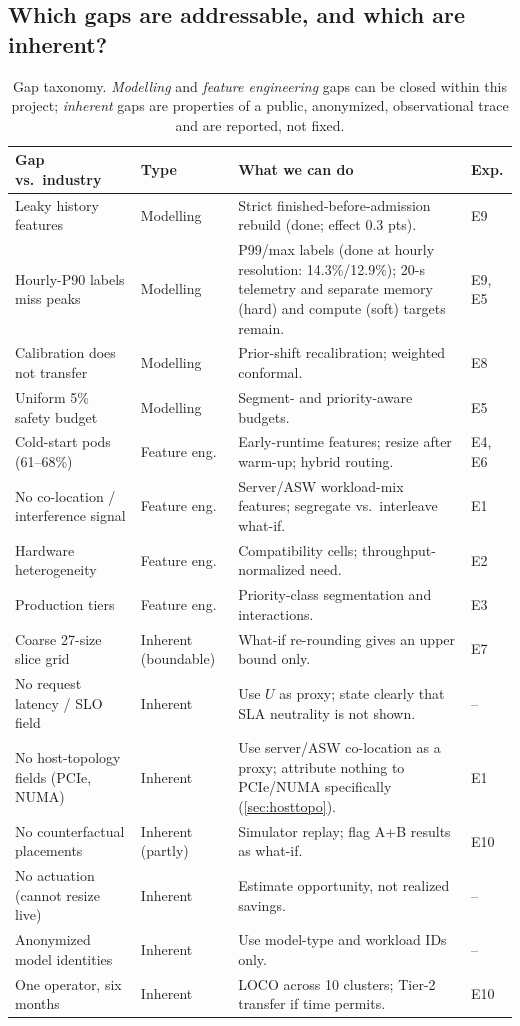 \subsection{Which gaps are addressable, and which are inherent?}

\begin{table}[h]
\centering\small
\caption{Gap taxonomy. \emph{Modelling} and \emph{feature engineering} gaps can be closed within this project; \emph{inherent} gaps are properties of a public, anonymized, observational trace and are reported, not fixed.}
\label{tab:gaps}
\begin{tabularx}{\linewidth}{@{}P{3.2cm}P{1.9cm}LP{1.0cm}@{}}
\toprule
Gap vs.\ industry & Type & What we can do & Exp. \\
\midrule
Leaky history features & Modelling & Strict finished-before-admission rebuild (done; effect 0.3 pts). & E9 \\
Hourly-P90 labels miss peaks & Modelling & P99/max labels (done at hourly resolution: 14.3\%/12.9\%); 20-s telemetry and separate memory (hard) and compute (soft) targets remain. & E9, E5 \\
Calibration does not transfer & Modelling & Prior-shift recalibration; weighted conformal. & E8 \\
Uniform 5\% safety budget & Modelling & Segment- and priority-aware budgets. & E5 \\
Cold-start pods (61--68\%) & Feature eng. & Early-runtime features; resize after warm-up; hybrid routing. & E4, E6 \\
No co-location / interference signal & Feature eng. & Server/ASW workload-mix features; segregate vs.\ interleave what-if. & E1 \\
Hardware heterogeneity & Feature eng. & Compatibility cells; throughput-normalized need. & E2 \\
Production tiers & Feature eng. & Priority-class segmentation and interactions. & E3 \\
\midrule
Coarse 27-size slice grid & Inherent (boundable) & What-if re-rounding gives an upper bound only. & E7 \\
No request latency / SLO field & Inherent & Use $U$ as proxy; state clearly that SLA neutrality is not shown. & -- \\
No host-topology fields (PCIe, NUMA) & Inherent & Use server/ASW co-location as a proxy; attribute nothing to PCIe/NUMA specifically (\cref{sec:hosttopo}). & E1 \\
No counterfactual placements & Inherent (partly) & Simulator replay; flag A+B results as what-if. & E10 \\
No actuation (cannot resize live) & Inherent & Estimate opportunity, not realized savings. & -- \\
Anonymized model identities & Inherent & Use model-type and workload IDs only. & -- \\
One operator, six months & Inherent & LOCO across 10 clusters; Tier-2 transfer if time permits. & E10 \\
\bottomrule
\end{tabularx}
\end{table}

